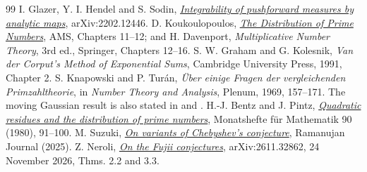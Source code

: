 \begin{thebibliography}{99}
 I. Glazer, Y. I. Hendel and S. Sodin, \href{https://arxiv.org/abs/2202.12446}{\emph{Integrability of pushforward measures by analytic maps}}, arXiv:2202.12446.
 D. Koukoulopoulos, \href{https://dms.umontreal.ca/~koukoulo/documents/publications/primes.pdf}{\emph{The Distribution of Prime Numbers}}, AMS, Chapters 11--12; and H. Davenport, \emph{Multiplicative Number Theory}, 3rd ed., Springer, Chapters 12--16.
 S. W. Graham and G. Kolesnik, \emph{Van der Corput's Method of Exponential Sums}, Cambridge University Press, 1991, Chapter 2.
 S. Knapowski and P. Tur\'an, \emph{\"Uber einige Fragen der vergleichenden Primzahltheorie}, in \emph{Number Theory and Analysis}, Plenum, 1969, 157--171. The moving Gaussian result is also stated in \cite[eq.~(5)]{bp} and \cite[after eq.~(17)]{suzuki}.
 H.-J. Bentz and J. Pintz, \href{https://personal.math.ubc.ca/~gerg/teaching/592-Fall2018/papers/1980.Bentz.pdf}{\emph{Quadratic residues and the distribution of prime numbers}}, Monatshefte f\"ur Mathematik 90 (1980), 91--100.
 M. Suzuki, \href{https://doi.org/10.1007/s11139-025-01238-9}{\emph{On variants of Chebyshev's conjecture}}, Ramanujan Journal (2025).
 Z. Neroli, \href{https://arxiv.org/abs/2611.32862}{\emph{On the Fujii conjectures}}, arXiv:2611.32862, 24 November 2026, Thms. 2.2 and 3.3.
\end{thebibliography}

